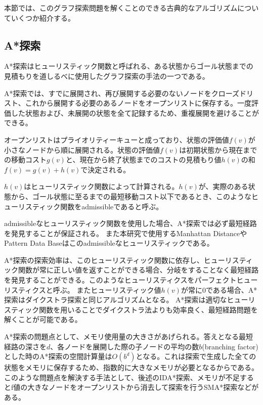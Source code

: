 \documentclass[a4paper,11pt,oneside,openany]{jsbook}
\begin{document}
本節では、このグラフ探索問題を解くことのできる古典的なアルゴリズムについていくつか紹介する。

\subsection{A*探索}
A*探索\cite{HNR68}はヒューリスティック関数と呼ばれる、ある状態からゴール状態までの見積もりを道しるべに使用したグラフ探索の手法の一つである。

A*探索では、すでに展開され、再び展開する必要のないノードをクローズドリスト、これから展開する必要のあるノードをオープンリストに保存する。一度評価した状態および、未展開の状態を全て記録するため、重複展開を避けることができる。

オープンリストはプライオリティーキューと成っており、状態の評価値$f(v)$が小さなノードから順に展開される。状態の評価値$f(v)$は初期状態から現在までの移動コスト$g(v)$と、現在から終了状態までのコストの見積もり値$h(v)$の和$f(v) = g(v) + h(v)$で決定される。

$h(v)$はヒューリスティック関数によって計算される。$h(v)$が、実際のある状態から、ゴール状態に至るまでの最短移動コスト以下であるとき、このようなヒューリスティック関数をadmissibleであると呼ぶ。

admissibleなヒューリスティック関数を使用した場合、A*探索では必ず最短経路を発見することが保証される。
また本研究で使用するManhattan DistanceやPattern Data Baseはこのadmissibleなヒューリスティックである。

A*探索の探索効率は、このヒューリスティック関数に依存し、ヒューリスティック関数が常に正しい値を返すことができる場合、分岐をすることなく最短経路を発見することができる。このようなヒューリスティクスをパーフェクトヒューリスティクスと呼ぶ。
またヒューリスティック値$h(v)$が常に0である場合、A*探索はダイクストラ探索と同じアルゴリズムとなる。
A*探索は適切なヒューリスティック関数を用いることでダイクストラ法よりも効率良く、最短経路問題を解くことが可能である。

A*探索の問題点として、メモリ使用量の大きさがあげられる。答えとなる最短経路の深さを$d$、各ノードを展開した際の子ノードの平均の数$b$(branching factor)とした時のA*探索の空間計算量は$O(b^d)$となる。これは探索で生成した全ての状態をメモリに保存するため、指数的に大きなメモリが必要となるからである。
このような問題点を解決する手法として、後述のIDA*探索\cite{Kor85}、メモリが不足するとf値の大きなノードをオープンリストから消去して探索を行うSMA*探索\cite{Rus92}などがある。
\end{document}
